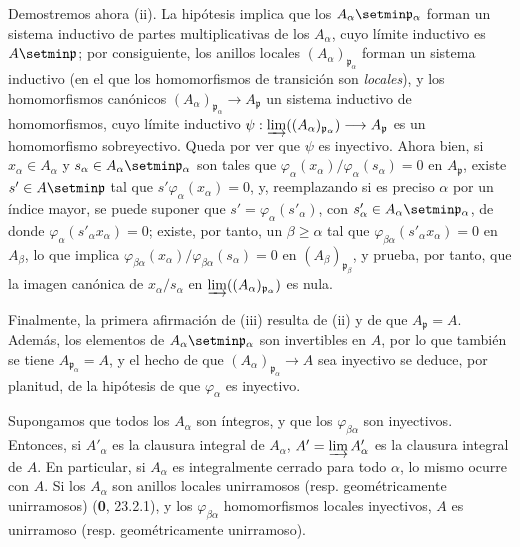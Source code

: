 Demostremos ahora (ii). La hipótesis implica que los
$A_\alpha\setmin\mathfrak p_\alpha$ forman un sistema inductivo de partes
multiplicativas de los $A_\alpha$, cuyo límite inductivo es
$A\setmin\mathfrak p$; por consiguiente, los anillos locales
$(A_\alpha)_{\mathfrak p_\alpha}$ forman un sistema inductivo (en el que los
homomorfismos de transición son \emph{locales}), y los homomorfismos canónicos
$(A_\alpha)_{\mathfrak p_\alpha}\to A_{\mathfrak p}$ un sistema inductivo de
homomorfismos, cuyo límite inductivo
$\psi:\varinjlim((A_\alpha)_{\mathfrak p_\alpha})
\longrightarrow A_{\mathfrak p}$
es un homomorfismo sobreyectivo. Queda por ver que $\psi$ es inyectivo. Ahora
bien, si $x_\alpha\in A_\alpha$ y
$s_\alpha\in A_\alpha\setmin\mathfrak p_\alpha$ son tales que
$\varphi_\alpha(x_\alpha)/\varphi_\alpha(s_\alpha)=0$ en
$A_{\mathfrak p}$, existe $s'\in A\setmin\mathfrak p$ tal que
$s'\varphi_\alpha(x_\alpha)=0$, y, reemplazando si es preciso $\alpha$ por un
índice mayor, se puede suponer que $s'=\varphi_\alpha(s'_\alpha)$, con
$s'_\alpha\in A_\alpha\setmin\mathfrak p_\alpha$, de donde
$\varphi_\alpha(s'_\alpha x_\alpha)=0$; existe, por tanto, un
$\beta\geq\alpha$ tal que
$\varphi_{\beta\alpha}(s'_\alpha x_\alpha)=0$ en $A_\beta$, lo que implica
$\varphi_{\beta\alpha}(x_\alpha)/\varphi_{\beta\alpha}(s_\alpha)=0$ en
$(A_\beta)_{\mathfrak p_\beta}$, y prueba, por tanto, que la imagen canónica de
$x_\alpha/s_\alpha$ en $\varinjlim((A_\alpha)_{\mathfrak p_\alpha})$ es nula.

Finalmente, la primera afirmación de (iii) resulta de (ii) y de que
$A_{\mathfrak p}=A$. Además, los elementos de
$A_\alpha\setmin\mathfrak p_\alpha$ son invertibles en $A$, por lo que también se
tiene $A_{\mathfrak p_\alpha}=A$, y el hecho de que
$(A_\alpha)_{\mathfrak p_\alpha}\to A$ sea inyectivo se deduce, por planitud,
de la hipótesis de que $\varphi_\alpha$ es inyectivo.

\begin{corollary}[5.13.4]
\label{IV.2.s5.13.4-fr}
Supongamos que todos los $A_\alpha$ son íntegros, y que los
$\varphi_{\beta\alpha}$ son inyectivos. Entonces, si $A'_\alpha$ es la
clausura integral de $A_\alpha$, $A'=\varinjlim A'_\alpha$ es la clausura
integral de $A$. En particular, si $A_\alpha$ es integralmente cerrado para
todo $\alpha$, lo mismo ocurre con $A$. Si los $A_\alpha$ son anillos locales
unirramosos \textup{(resp.} geométricamente unirramosos) \textup{(\textbf 0, 23.2.1)}, y los
$\varphi_{\beta\alpha}$ homomorfismos locales inyectivos, $A$ es unirramoso
\textup{(resp.} geométricamente unirramoso).
\end{corollary}

